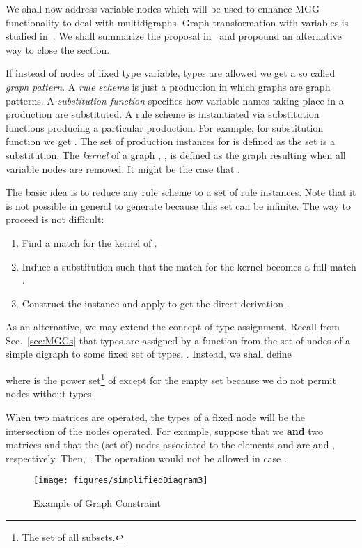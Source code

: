 \documentclass{fundam}
\begin{document}
We shall now address variable nodes which will be used to enhance MGG
functionality to deal with multidigraphs. Graph transformation with
variables is studied in~\cite{Hof05}. We shall summarize the proposal
in~\cite{Hof05} and propound an alternative way to close the section.

If instead of nodes of fixed type variable, types are allowed we get a
so called \emph{graph pattern}. A \emph{rule scheme} is just a
production in which graphs are graph patterns. A \emph{substitution
  function}  specifies how variable names taking place in a
production are substituted.  A rule scheme  is instantiated via
substitution functions producing a particular production. For example,
for substitution function  we get . The set of
production instances for  is defined as the set   is a
substitution. The \emph{kernel} of a graph ,
, is defined as the graph resulting when all variable nodes
are removed.  It might be the case that .

The basic idea is to reduce any rule scheme to a set of rule
instances.  Note that it is not possible in general to generate
 because this set can be infinite.  The way to proceed
is not difficult:
\begin{enumerate}
\item Find a match for the kernel of .
\item Induce a substitution  such that the match for the kernel
  becomes a full match .
\item Construct the instance  and apply  to
  get the direct derivation .
\end{enumerate}

As an alternative, we may extend the concept of type
assignment. Recall from Sec.~\ref{sec:MGGs} that types are assigned by
a function from the set of nodes  of a simple digraph  to some
fixed set  of types, . Instead, we shall define

where  is the power set\footnote{The set of all
  subsets.} of  except for the empty set because we do not permit
nodes without types.

When two matrices are operated, the types of a fixed node will be the
intersection of the nodes operated. For example, suppose that we
\textbf{and} two matrices  and that the (set of) nodes
associated to the elements  and  are  and
, respectively. Then, . The operation would not be allowed in case . 

\begin{figure}[htbp]
  \centering
  \texttt{[image: figures/simplifiedDiagram3]}
  \caption{Example of Graph Constraint}
  \label{fig:simplifiedDiagram2}
\end{figure}
\end{document}
